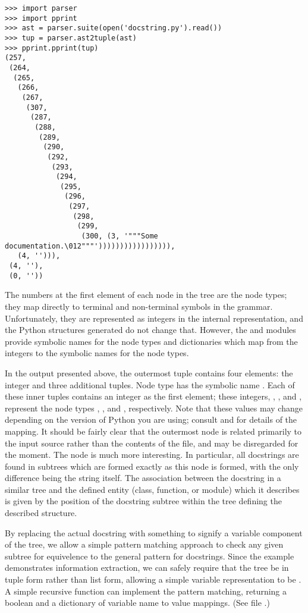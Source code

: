 \bcode\begin{verbatim}
>>> import parser
>>> import pprint
>>> ast = parser.suite(open('docstring.py').read())
>>> tup = parser.ast2tuple(ast)
>>> pprint.pprint(tup)
(257,
 (264,
  (265,
   (266,
    (267,
     (307,
      (287,
       (288,
        (289,
         (290,
          (292,
           (293,
            (294,
             (295,
              (296,
               (297,
                (298,
                 (299,
                  (300, (3, '"""Some documentation.\012"""'))))))))))))))))),
   (4, ''))),
 (4, ''),
 (0, ''))
\end{verbatim}\ecode
%
The numbers at the first element of each node in the tree are the node
types; they map directly to terminal and non-terminal symbols in the
grammar.  Unfortunately, they are represented as integers in the
internal representation, and the Python structures generated do not
change that.  However, the  and  modules
provide symbolic names for the node types and dictionaries which map
from the integers to the symbolic names for the node types.

In the output presented above, the outermost tuple contains four
elements: the integer  and three additional tuples.  Node
type  has the symbolic name .  Each of
these inner tuples contains an integer as the first element; these
integers, , , and , represent the node types
, , and , respectively.
Note that these values may change depending on the version of Python
you are using; consult  and  for
details of the mapping.  It should be fairly clear that the outermost
node is related primarily to the input source rather than the contents
of the file, and may be disregarded for the moment.  The 
node is much more interesting.  In particular, all docstrings are
found in subtrees which are formed exactly as this node is formed,
with the only difference being the string itself.  The association
between the docstring in a similar tree and the defined entity (class,
function, or module) which it describes is given by the position of
the docstring subtree within the tree defining the described
structure.

By replacing the actual docstring with something to signify a variable
component of the tree, we allow a simple pattern matching approach to
check any given subtree for equivelence to the general pattern for
docstrings.  Since the example demonstrates information extraction, we
can safely require that the tree be in tuple form rather than list
form, allowing a simple variable representation to be
.  A simple recursive function can implement
the pattern matching, returning a boolean and a dictionary of variable
name to value mappings.  (See file .)


